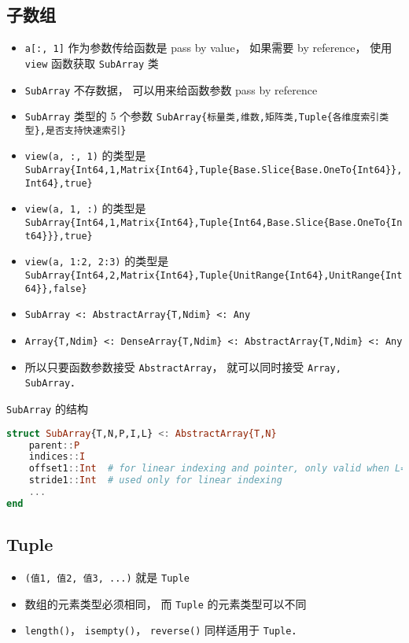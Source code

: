 \subsection{子数组}
\begin{itemize}
\item \verb|a[:, 1]| 作为参数传给函数是 pass by value， 如果需要 by reference， 使用 \verb|view| 函数获取 \verb|SubArray| 类
\item \verb|SubArray| 不存数据， 可以用来给函数参数 pass by reference
\item \verb|SubArray| 类型的 5 个参数 \verb|SubArray{标量类,维数,矩阵类,Tuple{各维度索引类型},是否支持快速索引}|
\item \verb|view(a, :, 1)| 的类型是 \verb|SubArray{Int64,1,Matrix{Int64},Tuple{Base.Slice{Base.OneTo{Int64}},Int64},true}|
\item \verb|view(a, 1, :)| 的类型是 \verb|SubArray{Int64,1,Matrix{Int64},Tuple{Int64,Base.Slice{Base.OneTo{Int64}}},true}|
\item \verb|view(a, 1:2, 2:3)| 的类型是 \verb|SubArray{Int64,2,Matrix{Int64},Tuple{UnitRange{Int64},UnitRange{Int64}},false}|
\item \verb|SubArray <: AbstractArray{T,Ndim} <: Any|
\item \verb|Array{T,Ndim} <: DenseArray{T,Ndim} <: AbstractArray{T,Ndim} <: Any|
\item 所以只要函数参数接受 \verb|AbstractArray|， 就可以同时接受 \verb|Array, SubArray|．
\end{itemize}

\verb|SubArray| 的结构
\begin{lstlisting}[language=julia]
struct SubArray{T,N,P,I,L} <: AbstractArray{T,N}
    parent::P
    indices::I
    offset1::Int  # for linear indexing and pointer, only valid when L==true
    stride1::Int  # used only for linear indexing
    ...
end
\end{lstlisting}

\subsection{Tuple}
\begin{itemize}
\item \verb|(值1, 值2, 值3, ...)| 就是 \verb|Tuple|
\item 数组的元素类型必须相同， 而 \verb|Tuple| 的元素类型可以不同
\item \verb|length()|， \verb|isempty()|， \verb|reverse()| 同样适用于 \verb|Tuple|．
\end{itemize}

